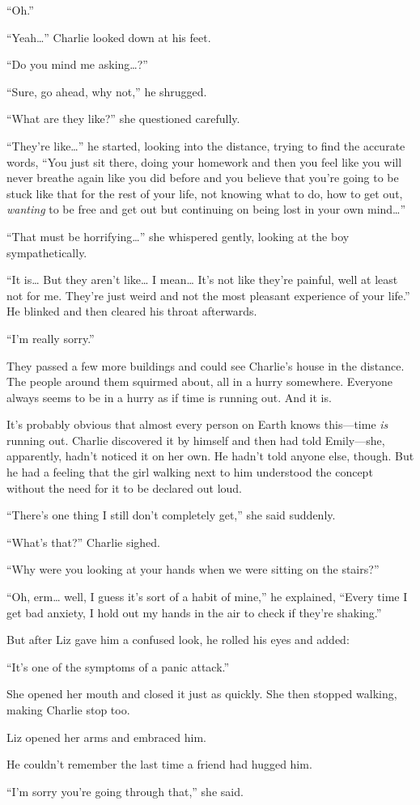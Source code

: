 “Oh.”

“Yeah…” Charlie looked down at his feet.

“Do you mind me asking…?”

“Sure, go ahead, why not,” he shrugged.

“What are they like?” she questioned carefully.

“They're like…” he started, looking into the distance, trying to find the accurate words, “You just sit there, doing your homework and then you feel like you will never breathe again like you did before and you believe that you're going to be stuck like that for the rest of your life, not knowing what to do, how to get out, \textit{wanting} to be free and get out but continuing on being lost in your own mind…”

“That must be horrifying…” she whispered gently, looking at the boy sympathetically.

“It is… But they aren't like… I mean… It's not like they're painful, well at least not for me. They're just weird and not the most pleasant experience of your life.” He blinked and then cleared his throat afterwards.

“I'm really sorry.”

They passed a few more buildings and could see Charlie's house in the distance. The people around them squirmed about, all in a hurry somewhere. Everyone always seems to be in a hurry as if time is running out. And it is.

It's probably obvious that almost every person on Earth knows this—time \textit{is} running out. Charlie discovered it by himself and then had told Emily—she, apparently, hadn't noticed it on her own. He hadn't told anyone else, though. But he had a feeling that the girl walking next to him understood the concept without the need for it to be declared out loud.

“There's one thing I still don't completely get,” she said suddenly.

“What's that?” Charlie sighed.

“Why were you looking at your hands when we were sitting on the stairs?”

“Oh, erm… well, I guess it's sort of a habit of mine,” he explained, “Every time I get bad anxiety, I hold out my hands in the air to check if they're shaking.”

But after Liz gave him a confused look, he rolled his eyes and added:

“It's one of the symptoms of a panic attack.”

She opened her mouth and closed it just as quickly. She then stopped walking, making Charlie stop too.

Liz opened her arms and embraced him.

He couldn't remember the last time a friend had hugged him.

“I'm sorry you're going through that,” she said.